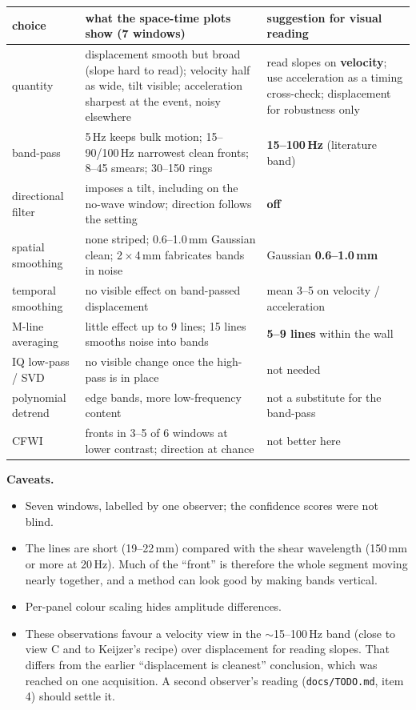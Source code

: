 \documentclass[10pt]{article}
\begin{document}
\begin{center}
\small
\begin{tabular}{p{4.2cm}p{11.2cm}p{7.2cm}}
\toprule
choice & what the space-time plots show (7 windows) & suggestion for visual reading \\
\midrule
quantity & displacement smooth but broad (slope hard to read); velocity half as wide, tilt visible;
  acceleration sharpest at the event, noisy elsewhere & read slopes on \textbf{velocity}; use
  acceleration as a timing cross-check; displacement for robustness only \\
band-pass & 5\,Hz keeps bulk motion; 15--90/100\,Hz narrowest clean fronts; 8--45 smears;
  30--150 rings & \textbf{15--100\,Hz} (literature band) \\
directional filter & imposes a tilt, including on the no-wave window; direction follows the
  setting & \textbf{off} \\
spatial smoothing & none striped; 0.6--1.0\,mm Gaussian clean; 2\,$\times$\,4\,mm fabricates bands
  in noise & Gaussian \textbf{0.6--1.0\,mm} \\
temporal smoothing & no visible effect on band-passed displacement & mean 3--5 on velocity /
  acceleration \\
M-line averaging & little effect up to 9 lines; 15 lines smooths noise into bands & \textbf{5--9 lines}
  within the wall \\
IQ low-pass / SVD & no visible change once the high-pass is in place & not needed \\
polynomial detrend & edge bands, more low-frequency content & not a substitute for the band-pass \\
CFWI & fronts in 3--5 of 6 windows at lower contrast; direction at chance & not better here \\
\bottomrule
\end{tabular}
\end{center}

\textbf{Caveats.}
\begin{itemize}
  \item Seven windows, labelled by one observer; the confidence scores were not blind.
  \item The lines are short (19--22\,mm) compared with the shear wavelength (150\,mm or more at
    20\,Hz). Much of the ``front'' is therefore the whole segment moving nearly together, and a
    method can look good by making bands vertical.
  \item Per-panel colour scaling hides amplitude differences.
  \item These observations favour a velocity view in the $\sim$15--100\,Hz band (close to view C
    and to Keijzer's recipe) over displacement for reading slopes. That differs from the earlier
    ``displacement is cleanest'' conclusion, which was reached on one acquisition. A second
    observer's reading (\texttt{docs/TODO.md}, item 4) should settle it.
\end{itemize}
\end{document}
